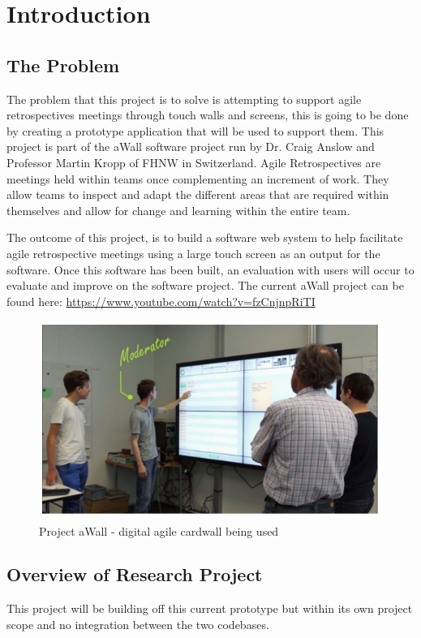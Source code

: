 \chapter{Introduction}\label{C:intro}
\section{The Problem} 
The problem that this project is to solve is attempting to support agile retrospectives meetings through touch walls and screens, this is going to be done by creating a prototype application that will be used to support them. This project is part of the aWall software project run by Dr. Craig Anslow and Professor Martin Kropp of FHNW in Switzerland. Agile Retrospectives are meetings held within teams once complementing an increment of work. They allow teams to inspect and adapt the different areas that are required within themselves and allow for change and learning within the entire team\cite{AgileRetrospectivesEstherDerby}.

The outcome of this project, is to build a software web system to help facilitate agile retrospective meetings using a large touch screen as an output for the software. Once this software has been built, an evaluation with users will occur to evaluate and improve on the software project. The current aWall project can be found here: \url{https://www.youtube.com/watch?v=fzCnjnpRiTI}

\begin{figure}[ht]
\centering
\includegraphics{aWall_introduction}
\caption{Project aWall - digital agile cardwall being used \cite{xp2017_aWall}}
\end{figure}

\section{Overview of Research Project}
This project will be building off this current prototype but within its own project scope and no integration between the two codebases.

